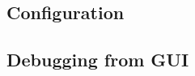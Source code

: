 \documentclass[10pt, a4paper, twoside]{article}
\numberwithin{equation}{subsection}
\numberwithin{figure}{section}
\numberwithin{table}{section}
\begin{document}
\subsection{Configuration}
\label{sec:configuration}

\newpage

\subsection{Debugging from GUI}
\label{sec:configuration}

\newpage


%
\end{document}
